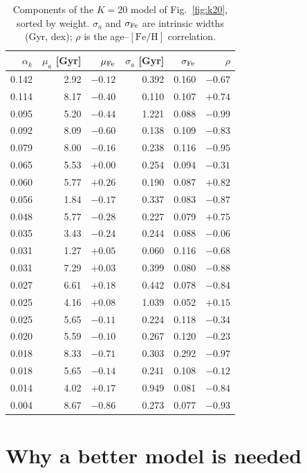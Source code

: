 \documentclass[11pt,a4paper]{article}
\newcommand{\feh}{\ensuremath{[\mathrm{Fe/H}]}}
\begin{document}
\begin{table}[t]
  \centering
  \small
  \caption{Components of the $K=20$ model of Fig.~\ref{fig:k20}, sorted by weight. $\sigma_a$ and $\sigma_{\rm Fe}$ are intrinsic widths (Gyr, dex); $\rho$ is the age--\feh{} correlation.}
  \label{tab:k20}
  \begin{tabular}{rrrrrr}
    \toprule
    $\alpha_k$ & $\mu_a$ [Gyr] & $\mu_{\rm Fe}$ & $\sigma_a$ [Gyr] & $\sigma_{\rm Fe}$ & $\rho$\\
    \midrule
0.142 & 2.92 & $-0.12$ & 0.392 & 0.160 & $-0.67$ \\
0.114 & 8.17 & $-0.40$ & 0.110 & 0.107 & $+0.74$ \\
0.095 & 5.20 & $-0.44$ & 1.221 & 0.088 & $-0.99$ \\
0.092 & 8.09 & $-0.60$ & 0.138 & 0.109 & $-0.83$ \\
0.079 & 8.00 & $-0.16$ & 0.238 & 0.116 & $-0.95$ \\
0.065 & 5.53 & $+0.00$ & 0.254 & 0.094 & $-0.31$ \\
0.060 & 5.77 & $+0.26$ & 0.190 & 0.087 & $+0.82$ \\
0.056 & 1.84 & $-0.17$ & 0.337 & 0.083 & $-0.87$ \\
0.048 & 5.77 & $-0.28$ & 0.227 & 0.079 & $+0.75$ \\
0.035 & 3.43 & $-0.24$ & 0.244 & 0.088 & $-0.06$ \\
0.031 & 1.27 & $+0.05$ & 0.060 & 0.116 & $-0.68$ \\
0.031 & 7.29 & $+0.03$ & 0.399 & 0.080 & $-0.88$ \\
0.027 & 6.61 & $+0.18$ & 0.442 & 0.078 & $-0.84$ \\
0.025 & 4.16 & $+0.08$ & 1.039 & 0.052 & $+0.15$ \\
0.025 & 5.65 & $-0.11$ & 0.224 & 0.118 & $-0.34$ \\
0.020 & 5.59 & $-0.10$ & 0.267 & 0.120 & $-0.23$ \\
0.018 & 8.33 & $-0.71$ & 0.303 & 0.292 & $-0.97$ \\
0.018 & 5.65 & $-0.14$ & 0.241 & 0.108 & $-0.12$ \\
0.014 & 4.02 & $+0.17$ & 0.949 & 0.081 & $-0.84$ \\
0.004 & 8.67 & $-0.86$ & 0.273 & 0.077 & $-0.93$ \\
    \bottomrule
  \end{tabular}
\end{table}

\section{Why a better model is needed}
\label{sec:motivation}
\end{document}

